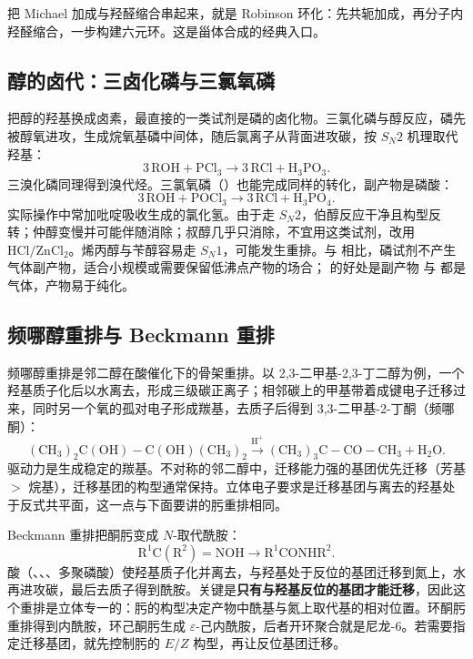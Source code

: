 \documentclass[UTF8]{ctexbook}
\begin{document}
把 Michael 加成与羟醛缩合串起来，就是 Robinson 环化：先共轭加成，再分子内羟醛缩合，一步构建六元环。这是甾体合成的经典入口。

\subsection{醇的卤代：三卤化磷与三氯氧磷}

把醇的羟基换成卤素，最直接的一类试剂是磷的卤化物。三氯化磷与醇反应，磷先被醇氧进攻，生成烷氧基磷中间体，随后氯离子从背面进攻碳，按 $S_N2$ 机理取代羟基：
\[
3\,\mathrm{ROH}+\mathrm{PCl_3}\longrightarrow 3\,\mathrm{RCl}+\mathrm{H_3PO_3}.
\]
三溴化磷同理得到溴代烃。三氯氧磷（）也能完成同样的转化，副产物是磷酸：
\[
3\,\mathrm{ROH}+\mathrm{POCl_3}\longrightarrow 3\,\mathrm{RCl}+\mathrm{H_3PO_4}.
\]
实际操作中常加吡啶吸收生成的氯化氢。由于走 $S_N2$，伯醇反应干净且构型反转；仲醇变慢并可能伴随消除；叔醇几乎只消除，不宜用这类试剂，改用 $\mathrm{HCl/ZnCl_2}$。烯丙醇与苄醇容易走 $S_N1$，可能发生重排。与  相比，磷试剂不产生气体副产物，适合小规模或需要保留低沸点产物的场合； 的好处是副产物  与  都是气体，产物易于纯化。

\subsection{频哪醇重排与 Beckmann 重排}

频哪醇重排是邻二醇在酸催化下的骨架重排。以 2,3-二甲基-2,3-丁二醇为例，一个羟基质子化后以水离去，形成三级碳正离子；相邻碳上的甲基带着成键电子迁移过来，同时另一个氧的孤对电子形成羰基，去质子后得到 3,3-二甲基-2-丁酮（频哪酮）：
\[
\mathrm{(CH_3)_2C(OH){-}C(OH)(CH_3)_2}
\xrightarrow{\mathrm{H^+}}
\mathrm{(CH_3)_3C{-}CO{-}CH_3}+\mathrm{H_2O}.
\]
驱动力是生成稳定的羰基。不对称的邻二醇中，迁移能力强的基团优先迁移（芳基 $>$ 烷基），迁移基团的构型通常保持。立体电子要求是迁移基团与离去的羟基处于反式共平面，这一点与下面要讲的肟重排相同。

Beckmann 重排把酮肟变成 $N$-取代酰胺：
\[
\mathrm{R^1C(R^2){=}NOH}\longrightarrow \mathrm{R^1CONHR^2}.
\]
酸（、、、多聚磷酸）使羟基质子化并离去，与羟基处于反位的基团迁移到氮上，水再进攻碳，最后去质子得到酰胺。关键是\textbf{只有与羟基反位的基团才能迁移}，因此这个重排是立体专一的：肟的构型决定产物中酰基与氮上取代基的相对位置。环酮肟重排得到内酰胺，环己酮肟生成 $\varepsilon$-己内酰胺，后者开环聚合就是尼龙-6。若需要指定迁移基团，就先控制肟的 $E/Z$ 构型，再让反位基团迁移。
\end{document}
